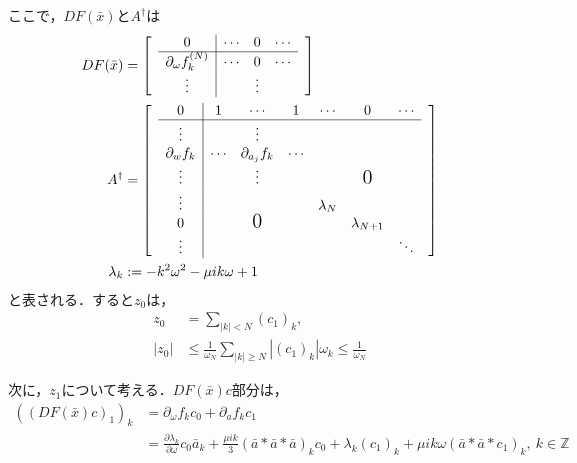 \documentclass[11pt,a4paper,titlepage]{jsreport}
\theoremstyle{definition}
\begin{document}
ここで，$DF(\bar{x})とA^\dagger$は
\begin{align*}
  DF(\bar{x}) & = \begin{bmatrix}
                     & \multicolumn{0}{c|}{0}                         & \cdots & 0      & \cdots & \\ \cline{2-5}
                     & \multicolumn{1}{c|}{\partial_\omega f_k^{(N)}} & \cdots & 0      & \cdots & \\
                     & \multicolumn{1}{c|}{\vdots}                    &        & \vdots &        &
                  \end{bmatrix}                                         \\
  A^\dagger   & = \begin{bmatrix}
                     & \multicolumn{1}{c|}{0}              & 1      & \cdots            & 1      & \cdots    & 0                & \cdots & \\ \cline{2-8}
                     & \multicolumn{1}{c|}{\vdots}         &        & \vdots            &        &           &                  &        & \\
                     & \multicolumn{1}{c|}{\partial_w f_k} & \cdots & \partial_{a_j}f_k & \cdots &           &                  &          \\
                     & \multicolumn{1}{c|}{\vdots}         &        & \vdots            &        &           & \text{\Large{0}} &          \\
                     & \multicolumn{1}{c|}{\vdots}         &        &                   &        & \lambda_N &                  &        & \\
                     & \multicolumn{1}{c|}{0}              &        & \text{\Large{0}}  &        &           & \lambda_{N+1}    &          \\
                     & \multicolumn{1}{c|}{\vdots}         &        &                   &        &           &                  & \ddots
                  \end{bmatrix} \\
  \lambda_k   & := -k^2\omega^2 - \mu ik\omega + 1
\end{align*}
と表される．すると$z_0$は，
\begin{align*}
  z_0 & = \sum_{|k|<N} (c_1)_k, \\
  |z_0| &\leq \frac{1}{\omega_N} \sum_{|k| \geq N} |(c_1)_k| \omega_k \leq \frac{1}{\omega_N}
\end{align*}

次に，$z_1$について考える．$DF(\bar{x})c$部分は，
\begin{equation*}
  \begin{split}
    \left(\left(DF(\bar{x})c\right)_1 \right)_k &= \partial_\omega f_k c_0 + \partial_a f_k c_1 \\
    &= \frac{\partial \lambda_k}{\partial \omega} c_0 \bar{a}_k + \frac{\mu ik}{3} \left( \bar{a} * \bar{a} * \bar{a} \right)_k c_0 + \lambda_k (c_1)_k + \mu ik \omega \left( \bar{a} * \bar{a} * c_1 \right)_k,\ k \in \mathbb{Z}
  \end{split}
\end{equation*}
\end{document}
